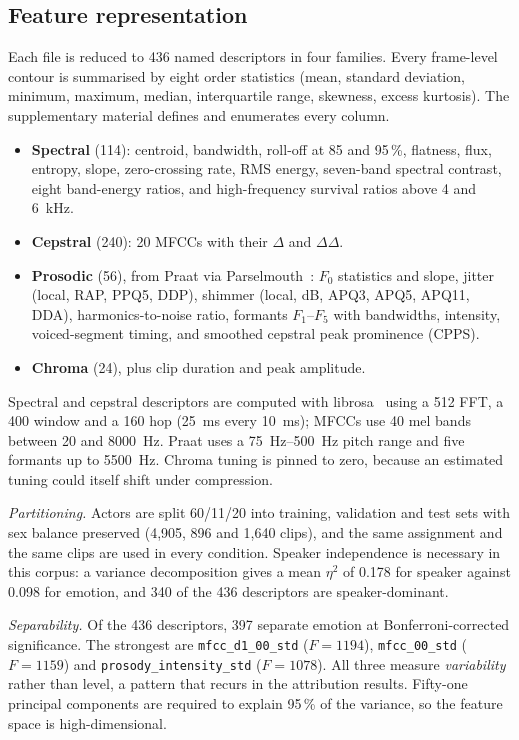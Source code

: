 \documentclass[lettersize,journal]{IEEEtran}
\newcommand{\ttf}[1]{\texttt{\footnotesize #1}}
\begin{document}
\subsection{Feature representation}\label{sec:features}
Each file is reduced to 436 named descriptors in four families. Every
frame-level contour is summarised by eight order statistics (mean, standard
deviation, minimum, maximum, median, interquartile range, skewness, excess
kurtosis). The supplementary material defines and enumerates every column.
\begin{itemize}
\item \textbf{Spectral} (114): centroid, bandwidth, roll-off at 85 and 95\,\%,
flatness, flux, entropy, slope, zero-crossing rate, RMS energy, seven-band
spectral contrast, eight band-energy ratios, and high-frequency survival ratios
above 4 and \SI{6}{\kilo\hertz}.
\item \textbf{Cepstral} (240): 20 MFCCs with their $\Delta$ and $\Delta\Delta$.
\item \textbf{Prosodic} (56), from Praat via
Parselmouth~\cite{jadoul2018parselmouth}: $F_0$ statistics and slope, jitter
(local, RAP, PPQ5, DDP), shimmer (local, dB, APQ3, APQ5, APQ11, DDA),
harmonics-to-noise ratio, formants $F_1$--$F_5$ with bandwidths, intensity,
voiced-segment timing, and smoothed cepstral peak prominence (CPPS).
\item \textbf{Chroma} (24), plus clip duration and peak amplitude.
\end{itemize}
Spectral and cepstral descriptors are computed with
librosa~\cite{mcfee2015librosa} using a \SI{512}{\point} FFT, a
\SI{400}{\sample} window and a \SI{160}{\sample} hop (\SI{25}{\milli\second}
every \SI{10}{\milli\second}); MFCCs use 40 mel bands between 20 and
\SI{8000}{\hertz}. Praat uses a \SIrange{75}{500}{\hertz} pitch range and five
formants up to \SI{5500}{\hertz}. Chroma tuning is pinned to zero, because an
estimated tuning could itself shift under compression.

\textit{Partitioning.} Actors are split 60/11/20 into training, validation and
test sets with sex balance preserved (4{,}905, 896 and 1{,}640 clips), and the
same assignment and the same clips are used in every condition. Speaker
independence is necessary in this corpus: a variance decomposition gives a mean
$\eta^2$ of 0.178 for speaker against 0.098 for emotion, and 340 of the 436
descriptors are speaker-dominant.

\textit{Separability.} Of the 436 descriptors, 397 separate emotion at
Bonferroni-corrected significance. The strongest are \ttf{mfcc\_d1\_00\_std}
($F=1194$), \ttf{mfcc\_00\_std} ($F=1159$) and \ttf{prosody\_intensity\_std}
($F=1078$). All three measure \emph{variability} rather than level, a pattern
that recurs in the attribution results. Fifty-one principal components are
required to explain 95\,\% of the variance, so the feature space is
high-dimensional.
\end{document}
